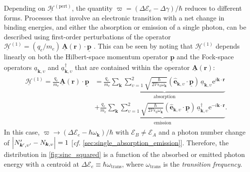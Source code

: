Depending on $\underline{\mathcal{H}}^{(\text{pert})}$, the quantity $\varpi = \left( \Delta \mathcal{E}_e - \Delta \gamma \right) / \hbar$ reduces to different forms. 
Processes that involve an electronic transition with a net change in binding energies, and either the absorption or emission of a single photon, can be described using first-order perturbations of the operator $\underline{\mathcal{H}}^{(1)} = (q_e / m_e) \, \underline{\mathbold{A}} ( \mathbold{r} ) \cdot \underline{\mathbold{p}}$ \cite[\emph{cf.\@} \cref{sec:ions_EM}]{Townsend00,Shankar04,Fontana_82,kapitell4,wysin2011quantization}. 
This can be seen by noting that $\underline{\mathcal{H}}^{(1)}$ depends linearly on both the Hilbert-space momentum operator $\underline{\mathbold{p}}$ and the Fock-space operators $\underline{a}_{\mathbold{k},\upsilon}$ and $\underline{a}^{\dagger}_{\mathbold{k},\upsilon}$ that are contained within the operator $\underline{\mathbold{A}} ( \mathbold{r} )$: 
\begin{align}\label{eq:single_photon_Hamiltonian}
 \begin{split}
 \underline{\mathcal{H}}^{(1)} = \frac{q_e}{m_e} \underline{\mathbold{A}} ( \mathbold{r} ) \cdot \underline{\mathbold{p}} &= \underbrace{\frac{q_e}{m_e} \sum_{\mathbold{k}} \sum_{\upsilon = 1}^2  \sqrt{\frac{\hbar}{2 \mathcal{V} \epsilon_0 \omega_{\mathbold{k}}}} \left( \hat{\mathbold{e}}_{\mathbold{k},\upsilon} \cdot \underline{\mathbold{p}} \right) \, \underline{a}_{\mathbold{k},\upsilon} \mathrm{e}^{i \mathbold{k} \cdot \mathbold{r} }}_{\text{absorption}} \\
 &+  \underbrace{\frac{q_e}{m_e} \sum_{\mathbold{k}} \sum_{\upsilon = 1}^2  \sqrt{\frac{\hbar}{2 \mathcal{V} \epsilon_0 \omega_{\mathbold{k}}}} \left( \hat{\mathbold{e}}_{\mathbold{k},\upsilon} \cdot \underline{\mathbold{p}} \right) \, \underline{a}^{\dagger}_{\mathbold{k},\upsilon} \mathrm{e}^{-i \mathbold{k} \cdot \mathbold{r}}}_{\text{emission}} . 
 \end{split}
 \end{align} 
In this case, $\varpi \to \left(\Delta \mathcal{E}_e - \hbar \omega_{\mathbold{k}} \right) / \hbar$ with $\mathcal{E}_B \neq \mathcal{E}_A$ and a photon number change of $\abs{N_{\mathbold{k}',\upsilon'}' - N_{\mathbold{k},\upsilon}} = 1$ [\emph{cf.\@} \cref{sec:single_absorption_emission}]. 
Therefore, the distribution in \cref{fig:sinc_squared} is a function of the absorbed or emitted photon energy with a centroid at $\Delta \mathcal{E}_e \equiv \hbar \omega_{\text{trans}}$, where $\omega_{\text{trans}}$ is the \emph{transition frequency}. 
